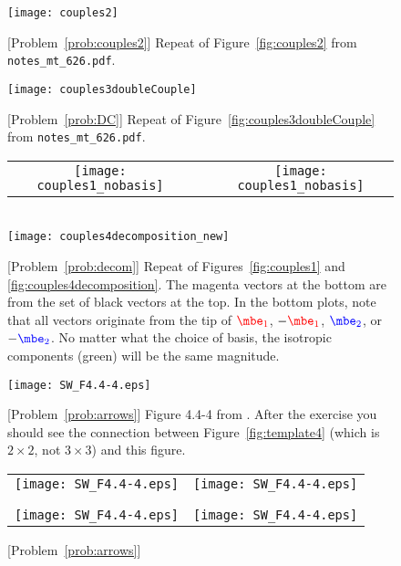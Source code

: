 \documentclass[11pt,titlepage,fleqn]{article}
\newcommand{\mtfile}{\texttt{notes\_mt\_626.pdf}}
\newcommand{\eone}{\textcolor{red}{\mbe_1}}
\newcommand{\etwo}{\textcolor{blue}{\mbe_2}}
\begin{document}
\begin{figure}
\hspace{-1cm}
\texttt{[image: couples2]}
\caption{
[Problem~\ref{prob:couples2}] 
Repeat of Figure~\ref{fig:couples2} from \mtfile.
\label{fig:template_couples2}
}
\end{figure}

\begin{figure}
\hspace{-1cm}
\texttt{[image: couples3doubleCouple]}
\caption{
[Problem~\ref{prob:DC}] 
Repeat of Figure~\ref{fig:couples3doubleCouple} from \mtfile.
\label{fig:templateDC}
}
\end{figure}

\begin{figure}
\centering
\begin{tabular}{ccc}
\texttt{[image: couples1\_nobasis]}
& \hspace{1.4cm} &
\texttt{[image: couples1\_nobasis]}
\end{tabular}
\\
\makebox{\hspace{0.5cm}}
\texttt{[image: couples4decomposition\_new]}
\caption{
[Problem~\ref{prob:decom}]
Repeat of Figures~\ref{fig:couples1} and \ref{fig:couples4decomposition}.
The magenta vectors at the bottom are from the set of black vectors at the top.
In the bottom plots, note that all vectors originate from the tip of $\eone$, $-\eone$, $\etwo$, or $-\etwo$.
No matter what the choice of basis, the isotropic components (green) will be the same magnitude.
\label{fig:decom}
}
\end{figure}


\begin{figure}
\centering
\texttt{[image: SW\_F4.4-4.eps]}
\caption{
[Problem~\ref{prob:arrows}]
Figure 4.4-4 from \citet{SteinWysession}.
After the exercise you should see the connection between Figure~\ref{fig:template4} (which is $2 \times 2$, not $3 \times 3$) and this figure.
\label{fig:SW}
}
\end{figure}

\begin{figure}
\hspace{-1cm}
\begin{tabular}{c|c}
\texttt{[image: SW\_F4.4-4.eps]} & \texttt{[image: SW\_F4.4-4.eps]} \\
& \\ \hline
& \\
\texttt{[image: SW\_F4.4-4.eps]} & \texttt{[image: SW\_F4.4-4.eps]} 
\end{tabular}
\caption{
[Problem~\ref{prob:arrows}]
\label{fig:SWfour}
}
\end{figure}

\clearpage\pagebreak



\end{document}
